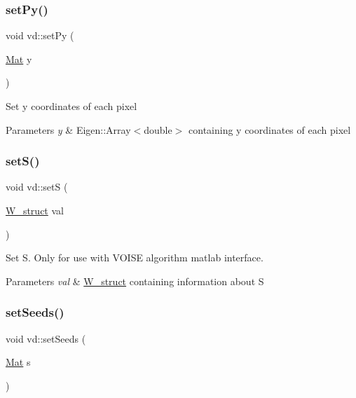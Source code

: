 \subsubsection{\texorpdfstring{set\+Py()}{setPy()}}
{\footnotesize\ttfamily void vd\+::set\+Py (\begin{DoxyParamCaption}\item[{\mbox{\hyperlink{typedefs_8cpp_a9fa28c1f74e909474857584f5c7b0088}{Mat}}}]{y }\end{DoxyParamCaption})}

Set y coordinates of each pixel 
\begin{DoxyParams}{Parameters}
{\em y} & Eigen\+::\+Array$<$double$>$ containing y coordinates of each pixel \\
\hline
\end{DoxyParams}
\mbox{\label{classvd_a0b4c53a592ec499899a37c2e6364806a}} 
\subsubsection{\texorpdfstring{set\+S()}{setS()}}
{\footnotesize\ttfamily void vd\+::setS (\begin{DoxyParamCaption}\item[{\mbox{\hyperlink{structW__struct}{W\+\_\+struct}}}]{val }\end{DoxyParamCaption})}

Set S. Only for use with V\+O\+I\+SE algorithm matlab interface. 
\begin{DoxyParams}{Parameters}
{\em val} & \mbox{\hyperlink{structW__struct}{W\+\_\+struct}} containing information about S \\
\hline
\end{DoxyParams}
\mbox{\label{classvd_a739318bbb45d4facfcc1899c71b91720}} 
\subsubsection{\texorpdfstring{set\+Seeds()}{setSeeds()}}
{\footnotesize\ttfamily void vd\+::set\+Seeds (\begin{DoxyParamCaption}\item[{\mbox{\hyperlink{typedefs_8cpp_a9fa28c1f74e909474857584f5c7b0088}{Mat}}}]{s }\end{DoxyParamCaption})}

